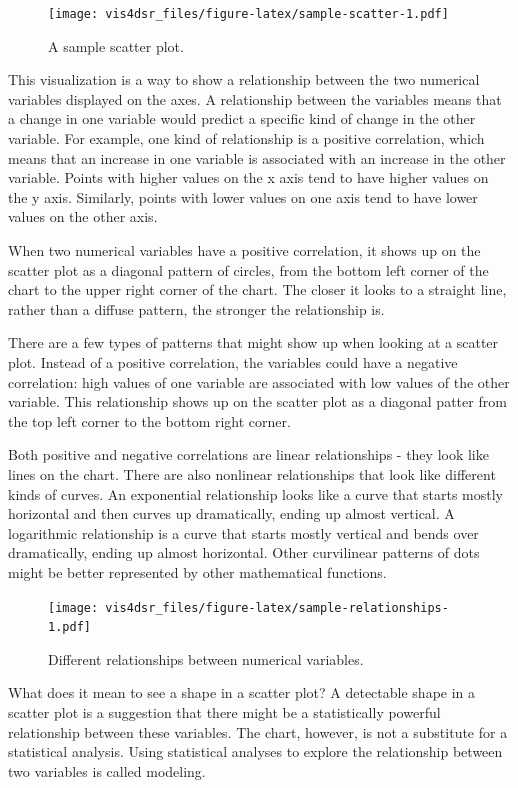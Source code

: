 \documentclass[
]{krantz}
\begin{document}
\begin{figure}
\centering
\texttt{[image: vis4dsr\_files/figure-latex/sample-scatter-1.pdf]}
\caption{\label{fig:sample-scatter}A sample scatter plot.}
\end{figure}

This visualization is a way to show a relationship between the two numerical variables
displayed on the axes. A relationship between the variables means that a change in one
variable would predict a specific kind of change in the other variable. For example,
one kind of relationship is a positive correlation, which means that an increase in
one variable is associated with an increase in the other variable. Points with higher
values on the x axis tend to have higher values on the y axis. Similarly, points
with lower values on one axis tend to have lower values on the other axis.

When two numerical variables have a positive correlation, it shows up on the scatter
plot as a diagonal pattern of circles, from the bottom left corner of the chart to
the upper right corner of the chart. The closer it looks to a straight line, rather
than a diffuse pattern, the stronger the relationship is.

There are a few types of patterns that might show up when looking at a scatter plot.
Instead of a positive correlation, the variables could have a negative correlation:
high values of one variable are associated with low values of the other variable. This
relationship shows up on the scatter plot as a diagonal patter from the top left
corner to the bottom right corner.

Both positive and negative correlations are linear relationships - they look like
lines on the chart. There are also nonlinear relationships that look like different
kinds of curves. An exponential relationship looks like a curve that starts
mostly horizontal and then curves up dramatically, ending up almost vertical.
A logarithmic relationship is a curve that starts mostly vertical and bends
over dramatically, ending up almost horizontal. Other curvilinear patterns of dots
might be better represented by other mathematical functions.

\begin{figure}
\centering
\texttt{[image: vis4dsr\_files/figure-latex/sample-relationships-1.pdf]}
\caption{\label{fig:sample-relationships}Different relationships between numerical variables.}
\end{figure}

What does it mean to see a shape in a scatter plot? A detectable shape in a scatter
plot is a suggestion that there might be a statistically powerful relationship
between these variables. The chart, however, is not a substitute for a statistical
analysis. Using statistical analyses to explore the relationship between two variables
is called modeling.
\end{document}
